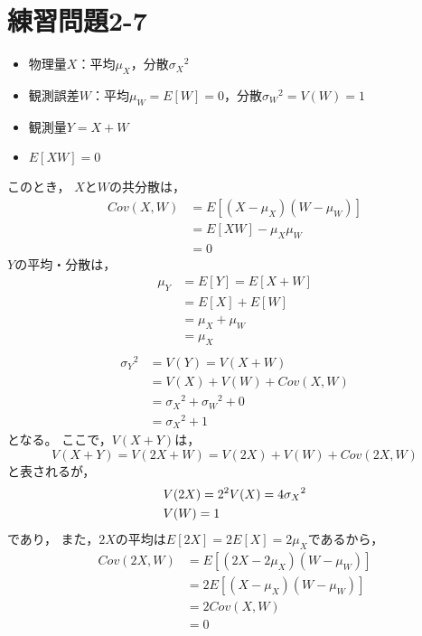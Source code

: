 \documentclass[class=jsarticle, crop=false, dvipdfmx, fleqn]{standalone}
\begin{document}
\section*{練習問題2-7}
\begin{itemize}
\item 物理量$X$：平均$\mu_X$，分散${\sigma_X}^2$
\item 観測誤差$W$：平均$\mu_W = E[W] = 0$，分散${\sigma_W}^2 = V(W) = 1$
\item 観測量$Y = X + W$
\item $E[XW] = 0$
\end{itemize}

このとき，
$X$と$W$の共分散は，
\begin{equation}
\begin{split}
Cov(X, W) & = E[(X - \mu_X)(W - \mu_W)] \\
	& = E[XW] - \mu_X \mu_W \\
	& = 0
\end{split}
\end{equation}
$Y$の平均・分散は，
\begin{equation}
\begin{split}
\mu_Y & = E[Y] = E[X + W] \\
	& = E[X] + E[W] \\
	& = \mu_X + \mu_W \\
	& = \mu_X \\
\end{split}
\end{equation}
\begin{equation}
\begin{split}
{\sigma_Y}^2 & = V(Y) = V(X + W) \\
	& = V(X) + V(W) + Cov(X, W) \\
	& = {\sigma_X}^2 + {\sigma_W}^2 + 0 \\
	& = {\sigma_X}^2 + 1
\end{split}
\end{equation}
となる。
ここで，$V(X + Y)$は，
\begin{equation}
V(X + Y) = V (2X + W) = V(2X) + V(W) + Cov(2X, W)
\end{equation}
と表されるが，
\begin{align}
& V(2X) = 2^2 V(X) = 4 {\sigma_X}^2 \\
& V(W) = 1 \notag
\end{align}
であり，
また，$2X$の平均は$E[2X] = 2E[X] = 2\mu_X$であるから，
\begin{equation}
\begin{split}
Cov(2X, W) & = E[(2X - 2\mu_X)(W - \mu_W)] \\
	& = 2E[(X - \mu_X)(W - \mu_W)] \\
	& = 2 Cov(X, W) \\
	& = 0
\end{split}
\end{equation}
\end{document}
